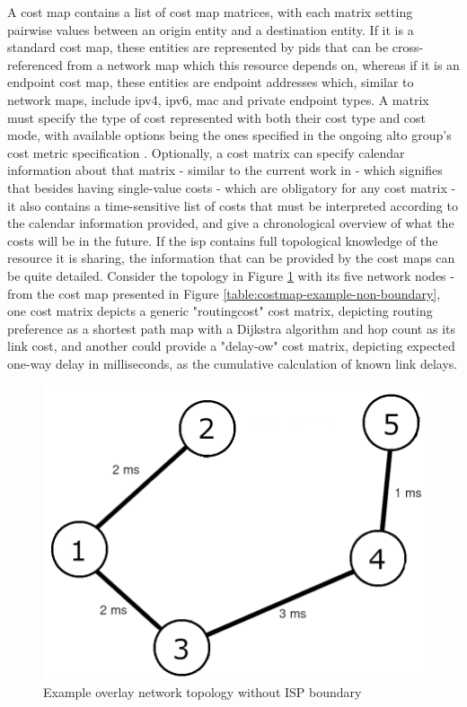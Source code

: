     A cost map contains a list of cost map matrices, with each matrix setting pairwise values between an origin entity and a destination entity.
    If it is a standard cost map, these entities are represented by \glspl{pid} that can be cross-referenced from a network map which this resource depends on, whereas if it is an endpoint cost map, these entities are endpoint addresses which, similar to network maps, include \gls{ipv4}, \gls{ipv6}, \gls{mac} and private endpoint types.
    A matrix must specify the type of cost represented with both their cost type and cost mode, with available options being the ones specified in the ongoing \gls{alto} group's cost metric specification \cite{alto-cost-metrics}.
    Optionally, a cost matrix can specify calendar information about that matrix - similar to the current work in \cite{alto-calendar-cost-map} - which signifies that besides having single-value costs - which are obligatory for any cost matrix - it also contains a time-sensitive list of costs that must be interpreted according to the calendar information provided, and give a chronological overview of what the costs will be in the future.
    If the \gls{isp} contains full topological knowledge of the resource it is sharing, the information that can be provided by the cost maps can be quite detailed.
    Consider the topology in Figure \ref{fig:example-topology} with its five network nodes - from the cost map presented in Figure \ref{table:costmap-example-non-boundary}, one cost matrix depicts a generic "routingcost" cost matrix, depicting routing preference as a shortest path map with a Dijkstra algorithm and hop count as its link cost, and another could provide a "delay-ow" cost matrix, depicting expected one-way delay in milliseconds, as the cumulative calculation of known link delays.

\begin{figure}[H]
        \centering
        \includegraphics[scale=1.00]{img/topology.png}
        \caption{Example overlay network topology without ISP boundary}
        \label{fig:example-topology}
\end{figure}

